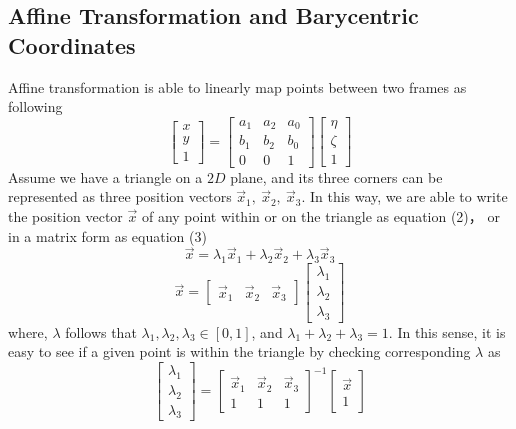 \documentclass{article}
\begin{document}
	\subsection{Affine Transformation and Barycentric Coordinates}
	Affine transformation is able to linearly map points between two frames as following
	\begin{equation}
	\begin{bmatrix}
	x\\
	y\\
	1
	\end{bmatrix}=\begin{bmatrix}
	a_1 & a_2& a_0\\b_1 & b_2 & b_0\\ 0 & 0 & 1
	\end{bmatrix}\begin{bmatrix}
	\eta \\\zeta\\1
	\end{bmatrix}
	\end{equation}
	Assume we have a triangle on a $2D$ plane, and its three corners can be represented as three position vectors $\overrightarrow{x}_1,~ \overrightarrow{x}_2,~\overrightarrow{x}_3$. In this way, we are able to write the position vector $\overrightarrow{x}$ of any point within or on the triangle as equation (2)， or in a matrix form as equation (3)
	\begin{equation}
	\overrightarrow{x}=\lambda_1\overrightarrow{x}_1+\lambda_2\overrightarrow{x}_2+\lambda_3\overrightarrow{x}_3
	\end{equation}
	\begin{equation}
	\overrightarrow{x}=\begin{bmatrix}
	\overrightarrow{x}_1 & \overrightarrow{x}_2 & \overrightarrow{x}_3
	\end{bmatrix}\begin{bmatrix}
	\lambda_1\\ \lambda_2\\ \lambda_3
	\end{bmatrix}
	\end{equation}
	where, $\lambda$ follows that $\lambda_1,\lambda_2,\lambda_3\in[0,1]$, and $\lambda_1+\lambda_2+\lambda_3=1$. In this sense, it is easy to see if a given point is within the triangle by checking corresponding $\lambda$ as
	\begin{equation}
	\begin{bmatrix}
	\lambda_1\\ \lambda_2\\ \lambda_3
	\end{bmatrix}=\begin{bmatrix}
	\overrightarrow{x}_1 & \overrightarrow{x}_2 & \overrightarrow{x}_3\\1 & 1 & 1
	\end{bmatrix}^{-1}\begin{bmatrix}
	\overrightarrow{x}\\1
	\end{bmatrix}
	\end{equation}
\end{document}
